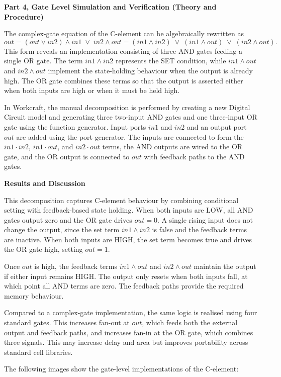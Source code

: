 \documentclass[a4paper,12pt]{article}
\begin{document}
\textbf{Part 4, Gate Level Simulation and Verification (Theory and Procedure)}

The complex-gate equation of the C-element can be algebraically rewritten as
\[
out = (out \lor in2)\land in1 \;\lor\; in2 \land out
     = (in1 \land in2) \;\lor\; (in1 \land out) \;\lor\; (in2 \land out).
\]
This form reveals an implementation consisting of three AND gates feeding a single OR gate. The term $in1 \land in2$ represents the SET condition, while $in1 \land out$ and $in2 \land out$ implement the state-holding behaviour when the output is already high. The OR gate combines these terms so that the output is asserted either when both inputs are high or when it must be held high.

In Workcraft, the manual decomposition is performed by creating a new Digital Circuit model and generating three two-input AND gates and one three-input OR gate using the function generator. Input ports $in1$ and $in2$ and an output port $out$ are added using the port generator. The inputs are connected to form the $in1\cdot in2$, $in1\cdot out$, and $in2\cdot out$ terms, the AND outputs are wired to the OR gate, and the OR output is connected to $out$ with feedback paths to the AND gates.

\textbf{Results and Discussion}

This decomposition captures C-element behaviour by combining conditional setting with feedback-based state holding. When both inputs are LOW, all AND gates output zero and the OR gate drives $out=0$. A single rising input does not change the output, since the set term $in1\land in2$ is false and the feedback terms are inactive. When both inputs are HIGH, the set term becomes true and drives the OR gate high, setting $out=1$.

Once $out$ is high, the feedback terms $in1\land out$ and $in2\land out$ maintain the output if either input remains HIGH. The output only resets when both inputs fall, at which point all AND terms are zero. The feedback paths provide the required memory behaviour.

Compared to a complex-gate implementation, the same logic is realised using four standard gates. This increases fan-out at $out$, which feeds both the external output and feedback paths, and increases fan-in at the OR gate, which combines three signals. This may increase delay and area but improves portability across standard cell libraries.

The following images show the gate-level implementations of the C-element:
\end{document}
